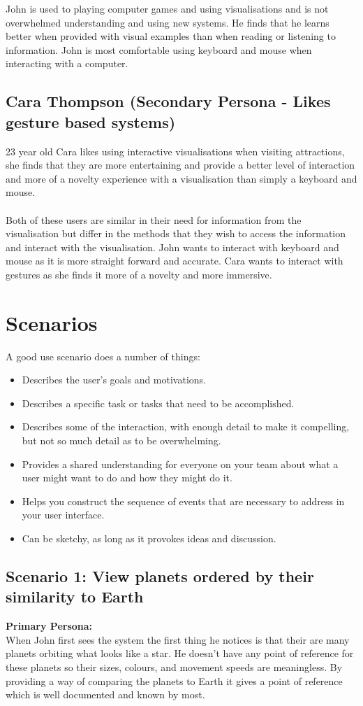 John is used to playing computer games and using visualisations and is not
overwhelmed understanding and using new systems. He finds that he learns better
when provided with visual examples than when reading or listening to
information. John is most comfortable using keyboard and mouse when interacting
with a computer.
\subsection{Cara Thompson (Secondary Persona - Likes gesture based systems)}
23 year old Cara likes using interactive visualisations when visiting
attractions, she finds that they are more entertaining and provide a better
level of interaction and more of a novelty experience with a visualisation than
simply a keyboard and mouse. 
\\\\
Both of these users are similar in their need for information from the
visualisation but differ in the methods that they wish to access the information
and interact with the visualisation. John wants to interact with keyboard and
mouse as it is more straight forward and accurate. Cara wants to interact with
gestures as she finds it more of a novelty and more immersive.
\section{Scenarios}
 A good use scenario does a number of things:
\begin{itemize}
 \item Describes the user's goals and motivations.
  \item Describes a specific task or tasks that need to be accomplished.
   \item Describes some of the interaction, with enough detail to make it
compelling, but not so much detail as to be overwhelming.
    \item Provides a shared understanding for everyone on your team about what a
user might want to do and how they might do it.
     \item Helps you construct the sequence of events that are necessary to
address in your user interface.
     \item Can be sketchy, as long as it provokes ideas and discussion.
\end{itemize}
 \subsection{Scenario 1: View planets ordered by their similarity to Earth}
   {\bf Primary Persona:}\\
 When John first sees the system the first thing he notices is that their are
many planets orbiting what looks like a star. He doesn't have any point of
reference for these planets so their sizes, colours, and movement speeds are
meaningless. By providing a way of comparing the planets to Earth it gives a
point of reference which is well documented and known by most.
 
